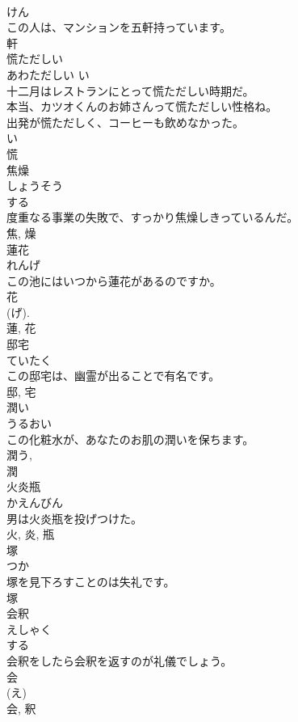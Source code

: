 \documentclass[8pt]{extreport}
\begin{document}
\begin{CJK}{UTF8}{min}
\\	けん	
\\	この人は、マンションを五軒持っています。	
\\	軒	
\\	慌ただしい	
\\	あわただしい	い 
\\	十二月はレストランにとって慌ただしい時期だ。	
\\	本当、カツオくんのお姉さんって慌ただしい性格ね。	
\\	出発が慌ただしく、コーヒーも飲めなかった。	
\\	い 
\\	慌	
\\	焦燥	
\\	しょうそう	
\\	する 
\\	度重なる事業の失敗で、すっかり焦燥しきっているんだ。	
\\	焦, 燥	
\\	蓮花	
\\	れんげ	
\\	この池にはいつから蓮花があるのですか。	
\\	花 
\\	(げ). 
\\	蓮, 花	
\\	邸宅	
\\	ていたく	
\\	この邸宅は、幽霊が出ることで有名です。	
\\	邸, 宅	
\\	潤い	
\\	うるおい	
\\	この化粧水が、あなたのお肌の潤いを保ちます。	
\\	潤う, 
\\	潤	
\\	火炎瓶	
\\	かえんびん	
\\	男は火炎瓶を投げつけた。	
\\	火, 炎, 瓶	
\\	塚	
\\	つか	
\\	塚を見下ろすことのは失礼です。	
\\	塚	
\\	会釈	
\\	えしゃく	
\\	する 
\\	会釈をしたら会釈を返すのが礼儀でしょう。	
\\	会 
\\	(え) 
\\	会, 釈	

\end{CJK}
\end{document}
